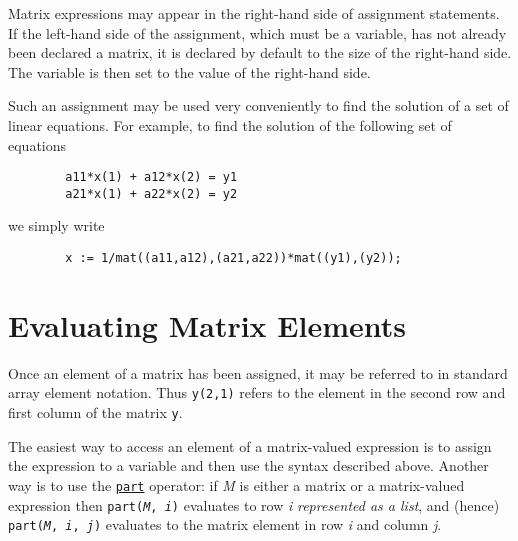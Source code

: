 Matrix expressions may appear in the right-hand side of assignment
statements. If the left-hand side of the assignment, which must be a
variable, has not already been declared a matrix, it is declared by default
to the size of the right-hand side. The variable is then set to the value
of the right-hand side.

Such an assignment may be used very conveniently to find the solution of a
set of linear equations. For example, to find the solution of the
following set of equations
\begin{verbatim}
        a11*x(1) + a12*x(2) = y1
        a21*x(1) + a22*x(2) = y2
\end{verbatim}
we simply write
\begin{verbatim}
        x := 1/mat((a11,a12),(a21,a22))*mat((y1),(y2));
\end{verbatim}

\section{Evaluating Matrix Elements}

Once an element of a matrix has been assigned, it may be referred to in
standard array element notation.  Thus \texttt{y(2,1)} refers to the element
in the second row and first column of the matrix \texttt{y}.

The easiest way to access an element of a matrix-valued expression is
to assign the expression to a variable and then use the syntax
described above.  Another way is to use the
\hyperlink{operator:PART}{\texttt{part}} operator: if \emph{M} is
either a matrix or a matrix-valued expression then
\texttt{part(\emph{M}, \emph{i})} evaluates to row \emph{i}
\emph{represented as a list}, and (hence) \texttt{part(\emph{M},
  \emph{i}, \emph{j})} evaluates to the matrix element in row \emph{i}
and column \emph{j}.
